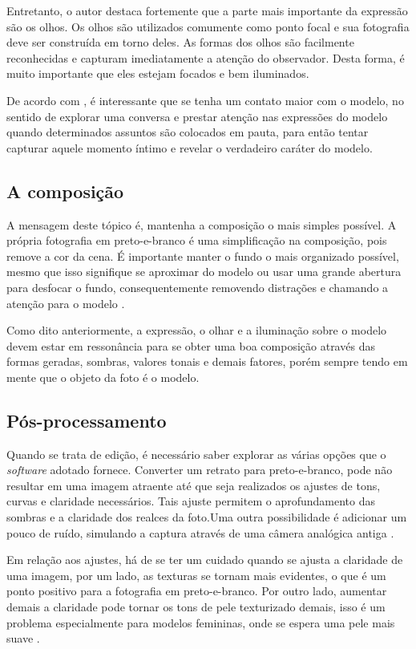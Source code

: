 \documentclass[
	article,			%
	12pt,				%
	oneside,			%
	a4paper,			%
	english,			%
	brazil,				%
	sumario=tradicional
	]{abntex2}
\begin{document}
Entretanto, o autor destaca fortemente que a parte mais importante da expressão são os olhos. Os olhos são utilizados comumente como ponto focal e sua fotografia deve ser construída em torno deles. As formas dos olhos são facilmente reconhecidas e capturam imediatamente a atenção do observador. Desta forma, é muito importante que eles estejam focados e bem iluminados.

De acordo com , é interessante que se tenha um contato maior com o modelo, no sentido de explorar uma conversa e prestar atenção nas expressões do modelo quando determinados assuntos são colocados em pauta, para então tentar capturar aquele momento íntimo e revelar o verdadeiro caráter do modelo.

\subsection{A composição}

A mensagem deste tópico é, mantenha a composição o mais simples possível. A própria fotografia em preto-e-branco é uma simplificação na composição, pois remove a cor da cena. É importante manter o fundo o mais organizado possível, mesmo que isso signifique se aproximar do modelo ou usar uma grande abertura para desfocar o fundo, consequentemente removendo distrações e chamando a atenção para o modelo \cite{SITE5TIPS}.

Como dito anteriormente, a expressão, o olhar e a iluminação sobre o modelo devem estar em ressonância para se obter uma boa composição através das formas geradas, sombras, valores tonais e demais fatores, porém sempre tendo em mente que o objeto da foto é o modelo.

\subsection{Pós-processamento}

Quando se trata de edição, é necessário saber explorar as várias opções que o \textit{software} adotado fornece. Converter um retrato para preto-e-branco, pode não resultar em uma imagem atraente até que seja realizados os ajustes de tons, curvas e claridade necessários. Tais ajuste permitem o aprofundamento das sombras e a claridade dos realces da foto.Uma outra possibilidade é adicionar um pouco de ruído, simulando a captura através de uma câmera analógica antiga \cite{SITEEXPERT}.

Em relação aos ajustes, há de se ter um cuidado quando se ajusta a claridade de uma imagem, por um lado, as texturas se tornam mais evidentes, o que é um ponto positivo para a fotografia em preto-e-branco. Por outro lado, aumentar demais a claridade pode tornar os tons de pele texturizado demais, isso é um problema especialmente para modelos femininas, onde se espera uma pele mais suave \cite{SITE5TIPS}.
\end{document}
